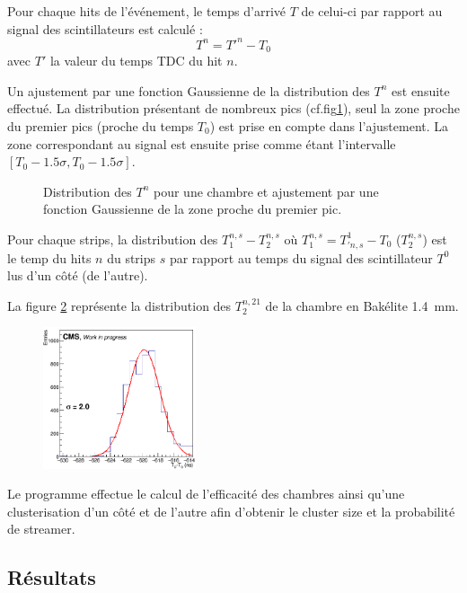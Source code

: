 Pour chaque hits de l'événement, le temps d'arrivé $T$ de celui-ci par rapport au signal des scintillateurs est calculé :
\begin{equation}
	T^n=T'^n-T_0
\end{equation}
avec $T'$ la valeur du temps TDC du hit $n$. 

Un ajustement par une fonction Gaussienne de la distribution des $T^n$ est ensuite effectué. La distribution présentant de nombreux pics (cf.fig\ref{pics}), seul la zone proche du premier pics (proche du temps $T_0$) est prise en compte dans l'ajustement. La zone correspondant au signal est ensuite prise comme étant l'intervalle $\left[T_0-\num{1.5}\sigma,T_0-\num{1.5}\sigma\right]$.

\begin{figure}[!ht]
	\centering
	\caption{Distribution des $T^n$ pour une chambre et ajustement par une fonction Gaussienne de la zone proche du premier pic.}
	\label{pics}
\end{figure}

Pour chaque strips, la distribution des $T^{n,s}_1-T^{n,s}_2$ où $T^{n,s}_1=T_{'n,s}^{1}-T_0$ ($T^{n,s}_2$) est le temp du hits $n$ du strips $s$ par rapport au temps du signal des scintillateur $T^{0}$ lus d'un côté (de l'autre).

La figure \ref{t2t0} représente la distribution des $T^{n,21}_2$ de la chambre en Bakélite \SI{1.4}{\milli\meter}.
\begin{figure}[ht!]
	\centering
	\includegraphics[width=0.40\textwidth]{ELE/TimingFitsRunT1T0_zoom_736185.jpg}
	\label{t2t0}
\end{figure}

Le programme effectue le calcul de l'efficacité des chambres ainsi  qu'une clusterisation d'un côté et de l'autre afin d'obtenir le cluster size et la probabilité de streamer. 

\subsection{Résultats}


